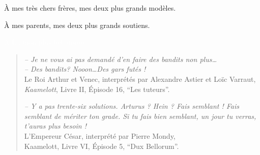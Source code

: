 
\begin{dedication}

    À mes très chers frères, mes deux plus grands modèles.

    À mes parents, mes deux plus grands soutiens.

    \textcolor{white}{À L., mon plus bel amour.}

    \vfill{}

    \hr{}


    \begin{small}
    \begin{quote}
        \emph{-- Je ne vous ai pas demandé d'en faire des \emph{bandits} non plus\dots}\\
        \emph{-- Des \emph{bandits}? Nooon\dots Des gars futés !}\\
        Le Roi Arthur et Venec,
        interprétés par Alexandre Astier et Loïc Varraut,\\
        \emph{Kaamelott}, Livre II, Épisode 16, ``Les tuteurs''.



    \vspace*{10pt}

        \emph{
            -- Y a pas trente-six solutions.
            Arturus ? Hein ? Fais semblant !
            Fais semblant de mériter ton grade.
            Si tu fais bien semblant, un jour tu verras, t'auras plus besoin !
        }\\
        L'Empereur César, interprété par Pierre Mondy,\\
        Kaamelott, Livre VI, Épisode 5, ``Dux Bellorum''.


\end{quote}
\end{small}
\end{dedication}
